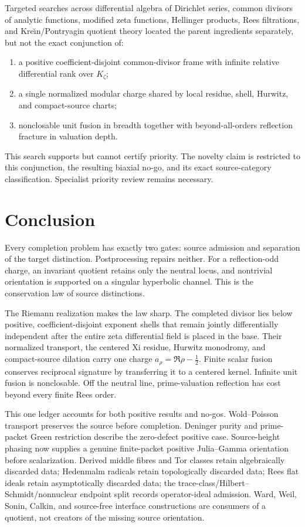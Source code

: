 \documentclass[11pt]{article}
\theoremstyle{definition}
\theoremstyle{remark}
\begin{document}
Targeted searches across differential algebra of Dirichlet series, common divisors of analytic
functions, modified zeta functions, Hellinger products, Rees filtrations, and
Kre\u\i n/Pontryagin quotient theory located the parent ingredients separately, but not the exact
conjunction of:
\begin{enumerate}[label=\textup{(\alph*)}]
\item a positive coefficient-disjoint common-divisor frame with infinite relative differential
rank over $K_\zeta$;
\item a single normalized modular charge shared by local residue, shell, Hurwitz, and
compact-source charts;
\item nonclosable unit fusion in breadth together with beyond-all-orders reflection fracture in
valuation depth.
\end{enumerate}
This search supports but cannot certify priority.  The novelty claim is restricted to this
conjunction, the resulting biaxial no-go, and its exact source-category classification.
Specialist priority review remains necessary.

\section{Conclusion}

Every completion problem has exactly two gates: source admission and separation of the target
distinction.  Postprocessing repairs neither.  For a reflection-odd charge, an invariant quotient
retains only the neutral locus, and nontrivial orientation is supported on a singular hyperbolic
channel.  This is the conservation law of source distinctions.

The Riemann realization makes the law sharp.  The completed divisor lies below positive,
coefficient-disjoint exponent shells that remain jointly differentially independent after the
entire zeta differential field is placed in the base.  Their normalized transport, the centered
Xi residue, Hurwitz monodromy, and compact-source dilation carry one charge
$a_\rho=\Re\rho-\tfrac12$.  Finite scalar fusion conserves reciprocal signature by transferring it
to a centered kernel.  Infinite unit fusion is nonclosable.  Off the neutral line, prime-valuation
reflection has cost beyond every finite Rees order.

This one ledger accounts for both positive results and no-gos.  Wold--Poisson transport preserves
the source before completion.  Deninger purity and prime-packet Green restriction describe the
zero-defect positive case.  Source-height phasing now supplies a genuine finite-packet positive
Julia--Gamma orientation before scalarization.  Derived middle fibres and Tor classes retain
algebraically discarded data; Hedenmalm radicals retain topologically discarded data; Rees flat
ideals retain asymptotically discarded data; the trace-class/Hilbert--Schmidt/nonnuclear endpoint
split records operator-ideal admission.  Ward, Weil, Sonin, Calkin, and source-free interface
constructions are consumers of a quotient, not creators of the missing source orientation.
\end{document}

